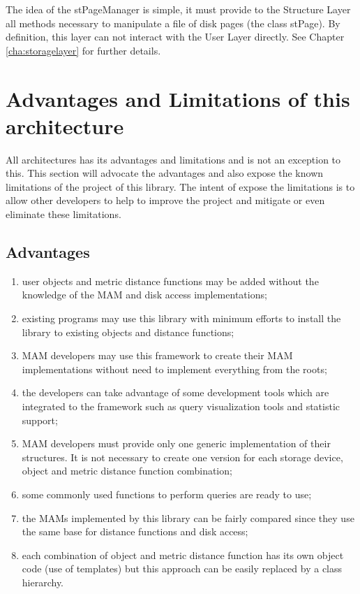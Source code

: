 The idea of the stPageManager is simple, it must provide to the Structure Layer all methods necessary to manipulate a file of disk pages (the class stPage). By definition, this layer can not interact with the User Layer directly. See Chapter \ref{cha:storagelayer} for further details.

\section{Advantages and Limitations of this architecture}
\label{sec:arch.advantages}

All architectures has its advantages and limitations and \libname{ }is not an exception to this. This section will advocate the advantages and also expose the known limitations of the project of this library. The intent of expose the limitations is to allow other developers to help to improve the project and mitigate or even eliminate these limitations.

\subsection{Advantages}
\begin{enumerate}
	\item user objects and metric distance functions may be added without the knowledge of the MAM and disk access implementations;
	\item existing programs may use this library with minimum efforts to install the library to existing objects and distance functions;
	\item MAM developers may use this framework to create their MAM implementations without need to implement everything from the roots;
	\item the developers can take advantage of some development tools which are integrated to the framework such as query visualization tools and statistic support;
	\item MAM developers must provide only one generic implementation of their structures. It is not necessary to create one version for each storage device, object and metric distance function combination;
	\item some commonly used functions to perform queries are ready to use;
	\item the MAMs implemented by this library can be fairly compared since they use the same base for distance functions and disk access;
	\item each combination of object and metric distance function has its own object code (use of templates) but this approach can be easily replaced by a class hierarchy.
\end{enumerate}

